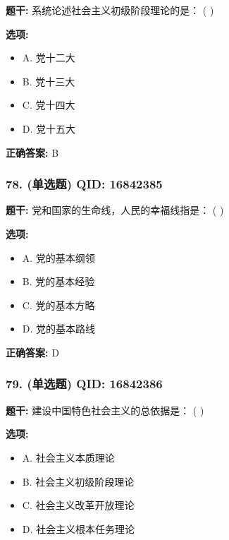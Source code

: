 \documentclass[12pt,UTF8]{ctexart}
\begin{document}
\textbf{题干:}
系统论述社会主义初级阶段理论的是： ( )

\textbf{选项:}
\begin{itemize}[leftmargin=*]

  \item A. 党十二大

  \item B. 党十三大

  \item C. 党十四大

  \item D. 党十五大

\end{itemize}

\textbf{正确答案:}
B

\vspace{0.3em}\hrulefill\vspace{0.7em}

\subsubsection*{78. (单选题) \small QID: 16842385}

\textbf{题干:}
党和国家的生命线，人民的幸福线指是： ( )

\textbf{选项:}
\begin{itemize}[leftmargin=*]

  \item A. 党的基本纲领

  \item B. 党的基本经验

  \item C. 党的基本方略

  \item D. 党的基本路线

\end{itemize}

\textbf{正确答案:}
D

\vspace{0.3em}\hrulefill\vspace{0.7em}

\subsubsection*{79. (单选题) \small QID: 16842386}

\textbf{题干:}
建设中国特色社会主义的总依据是： ( )

\textbf{选项:}
\begin{itemize}[leftmargin=*]

  \item A. 社会主义本质理论

  \item B. 社会主义初级阶段理论

  \item C. 社会主义改革开放理论

  \item D. 社会主义根本任务理论

\end{itemize}
\end{document}

